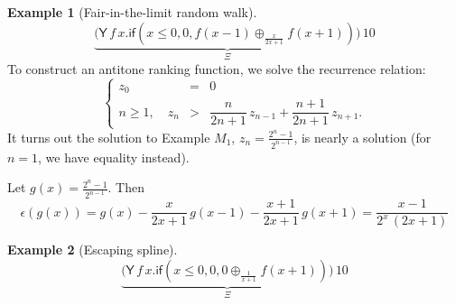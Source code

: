 \documentclass{article}
\newcommand{\tY}{\mathsf{Y}}
\newcommand{\tif}[3]{\mathsf{if}(#1, #2, #3)} %
\theoremstyle{definition}
\newtheorem{example}{Example}
\theoremstyle{lemma}
\theoremstyle{remark}
\begin{document}
\begin{example}[Fair-in-the-limit random walk]
\label{ex:Fair-in-the-limit random walk}\citep[\S 5.3]{DBLP:journals/pacmpl/McIverMKK18}
\[
\underbrace{\big
(\tY \, f \, x . 
\tif{x \leq 0}{0}{f(x - 1) \oplus_{\frac{x}{2x+1}} f(x + 1)} \big)}_{\Xi} 
\, 10
\]
To construct an antitone ranking function, we solve the recurrence relation:
\[
\left\{
\begin{array}{rll}
z_0 &=& 0\\
n \geq 1, \quad z_n &>& \dfrac{n}{2n + 1} \, z_{n-1} + \dfrac{n+1}{2n + 1} \, z_{n+1}.
\end{array}
\right.
\]
It turns out the solution to Example $M_1$, $z_n = \frac{2^n - 1}{2^{n-1}}$, is nearly a solution (for $n = 1$, we have equality instead). 

Let $g(x) = \frac{2^n - 1}{2^{n-1}}$.
Then 
\begin{equation}
\epsilon(g(x)) = 
g(x) - \dfrac{x}{2x + 1} \, g(x-1) - \dfrac{x+1}{2x + 1} \, g(x+1) 
= \dfrac{x-1}{2^{x} \, (2x + 1)}
\label{eqn:in the limit}
\end{equation}


\end{example}

\begin{example}[Escaping spline]
\label{ex:escaping spline}\citep[\S 5.4]{DBLP:journals/pacmpl/McIverMKK18}
\[
\underbrace{\big
(\tY \, f \, x . 
\tif{x \leq 0}{0}{0 \oplus_{\frac{1}{x+1}} f(x + 1)} \big)}_{\Xi} 
\, 10
\]
\end{example}







\end{document}
